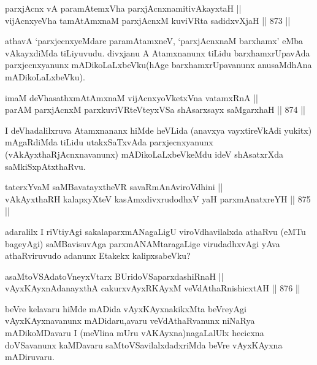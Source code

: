 \begin{shl}
parxjAcnx vA paramAtemxVha parxjAcnxnamitivAkayxtaH ||  \\
vijAcnxyeVha tamAtAmxnaM parxjAcnxM kuviVRta sadidxvXjaH \hfill || 873 ||  
\end{shl}

\begin{artha}
athavA `parxjecnxyeMdare paramAtamxneV, `parxjAcnxnaM barxhamx' eMba vAkayxdiMda tiLiyuvudu. divxjanu A Atamxnanunx tiLidu barxhamxrUpavAda parxjecnxyanunx mADikoLaLxbeVku(hAge barxhamxrUpavanunx anusaMdhAna mADikoLaLxbeVku).
\end{artha}


\begin{shl}
imaM deVhasathxmAtAmxnaM vijAcnxyoVketxVna vatamxRnA || \\
parAM parxjAcnxM parxkuviVRteVteyxVSa shAsarxsayx saMgarxhaH \hfill || 874 ||  
\end{shl}

\begin{artha}
I deVhadalilxruva Atamxnananx hiMde heVLida (anavxya vayxtireVkAdi yukitx) mAgaRdiMda tiLidu utakxSaTxvAda parxjecnxyanunx (vAkAyxthaRjAcnxnavanunx) mADikoLaLxbeVkeMdu ideV shAsatxrXda saMkiSxpAtxthaRvu.
\end{artha}

\begin{shl}
taterxYvaM saMBavatayxtheVR savaRmAnAviroVdhini ||  \\
vAkAyxthaRH kalapxyXteV kasAmxdivxrudodhxV yaH parxmAnatxreYH \hfill || 875 ||  
\end{shl}

\begin{artha}
adaralilx I riVtiyAgi sakalaparxmANagaLigU viroVdhavilalxda athaRvu (eMTu bageyAgi) saMBavisuvAga parxmANAMtaragaLige virudadhxvAgi yAva athaRviruvudo adanunx Etakekx kalipxsabeVku?
\end{artha}


\begin{shl}
asaMtoVSAdatoV\s neyxV\s tarx BUridoVSaparxdashiRnaH || \\
vAyxKAyxnAdanayxthA cakurxvAyxRKAyxM veVdAthaRnishicxtAH \hfill || 876 ||  
\end{shl}

\begin{artha}
beVre kelavaru hiMde mADida vAyxKAyxnakikxMta beVreyAgi vAyxKAyxnavanunx mADidaru,avaru veVdAthaRvanunx niNaRya mADikoMDavaru I (meVlina mUru vAKAyxna)nagaLalUlx hecicxna doVSavanunx kaMDavaru saMtoVSavilalxdadxriMda beVre vAyxKAyxna mADiruvaru.
\end{artha}

